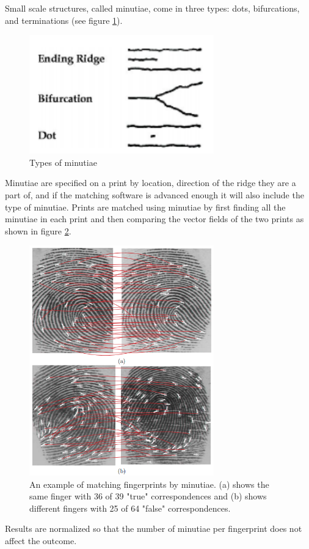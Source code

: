 \documentclass[a4paper]{article}
\begin{document}
Small scale structures, called minutiae, come in three types: dots, bifurcations, and terminations \cite[217-218]{umap} (see figure \ref{fig:minutiaetype}).
\begin{figure}
\centering
\includegraphics[width=8cm]{Minutiae_Types.PNG}
\caption{Types of minutiae}
\label{fig:minutiaetype}
\end{figure}
Minutiae are specified on a print by location, direction of the ridge they are a part of, and if the matching software is advanced enough it will also include the type of minutiae. Prints are matched using minutiae by first finding all the minutiae in each print and then comparing the vector fields of the two prints as shown in figure \ref{fig:minutiaematch}.
\begin{figure}
\centering
\includegraphics[width=8cm]{Minutiae_Matching.PNG}
\caption{An example of matching fingerprints by minutiae. (a) shows the same finger with 36 of 39 "true" correspondences and (b) shows different fingers with 25 of 64 "false" correspondences.}
\label{fig:minutiaematch}
\end{figure}
Results are normalized so that the number of minutiae per fingerprint does not affect the outcome. \cite{prabhakar}
\end{document}
